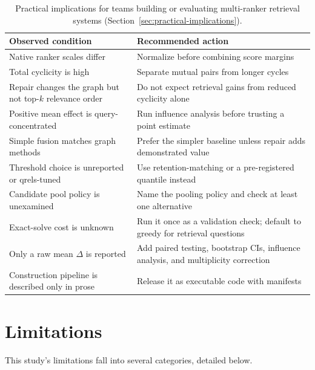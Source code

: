 \documentclass[manuscript,anonymous,review]{acmart}
\begin{document}
\begin{table}[t]
  \caption{Practical implications for teams building or evaluating
    multi-ranker retrieval systems (Section~\ref{sec:practical-implications}).}
  \label{tab:practical-implications}
  \small
  \begin{tabular}{p{3.6cm}p{3.9cm}}
    \toprule
    Observed condition & Recommended action \\
    \midrule
    Native ranker scales differ & Normalize before combining score margins \\
    Total cyclicity is high & Separate mutual pairs from longer cycles \\
    Repair changes the graph but not top-$k$ relevance order & Do not expect retrieval gains from reduced cyclicity alone \\
    Positive mean effect is query-concentrated & Run influence analysis before trusting a point estimate \\
    Simple fusion matches graph methods & Prefer the simpler baseline unless repair adds demonstrated value \\
    Threshold choice is unreported or qrels-tuned & Use retention-matching or a pre-registered quantile instead \\
    Candidate pool policy is unexamined & Name the pooling policy and check at least one alternative \\
    Exact-solve cost is unknown & Run it once as a validation check; default to greedy for retrieval questions \\
    Only a raw mean $\Delta$ is reported & Add paired testing, bootstrap CIs, influence analysis, and multiplicity correction \\
    Construction pipeline is described only in prose & Release it as executable code with manifests \\
    \bottomrule
  \end{tabular}
\end{table}

\section{Limitations}
\label{sec:threats}

This study's limitations fall into several categories, detailed below.
\end{document}
